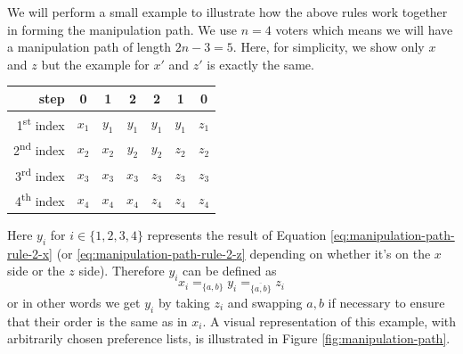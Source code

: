 	We will perform a small example to illustrate how the above rules work together in forming the manipulation path. We use $n = 4$ voters which means we will have a manipulation path of length $2n - 3 = 5$. Here, for simplicity, we show only $x$ and $z$ but the example for $x'$ and $z'$ is exactly the same.
	\begin{center}
		\begin{tabular}{r | c c c c c c}
			step						&	0		&	1		&	2		&	2		&	1		&	0		\\
			\hline
			1\textsuperscript{st} index	&	$x_1$	&	$y_1$	&	$y_1$	&	$y_1$	&	$y_1$	&	$z_1$	\\
			2\textsuperscript{nd} index	&	$x_2$	&	$x_2$	&	$y_2$	&	$y_2$	&	$z_2$	&	$z_2$	\\
			3\textsuperscript{rd} index	&	$x_3$	&	$x_3$	&	$x_3$	&	$z_3$	&	$z_3$	&	$z_3$	\\
			4\textsuperscript{th} index	&	$x_4$	&	$x_4$	&	$x_4$	&	$z_4$	&	$z_4$	&	$z_4$	\\
		\end{tabular}
	\end{center}
	Here $y_i$ for $i \in \{1, 2, 3, 4\}$ represents the result of Equation \ref{eq:manipulation-path-rule-2-x} (or \ref{eq:manipulation-path-rule-2-z} depending on whether it's on the $x$ side or the $z$ side). Therefore $y_i$ can be defined as
	\[
		x_i =_{\{a, b\}} y_i =_{\overline{\{a, b\}}} z_i
	\]
	or in other words we get $y_i$ by taking $z_i$ and swapping $a, b$ if necessary to ensure that their order is the same as in $x_i$. A visual representation of this example, with arbitrarily chosen preference lists, is illustrated in Figure \ref{fig:manipulation-path}.
